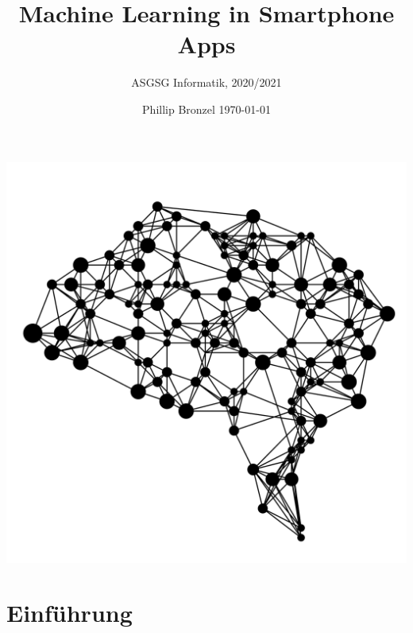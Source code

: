 \documentclass[12pt]{article}
\title{Machine Learning in Smartphone Apps}
\date{Phillip Bronzel \today}
\author{ASGSG Informatik, 2020/2021}
\begin{document}
  \maketitle
  \begin{center}
   \includegraphics[totalheight=10cm]{titlepage.png}
   \cite{titlepageimage}
  \end{center}

  \newpage
  \tableofcontents

  \newpage
  \section{Einführung}
  

  \newpage
  \printbibliography
\end{document}
